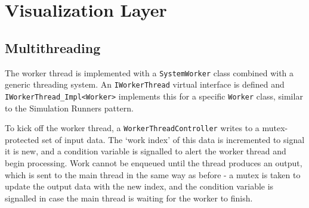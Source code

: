 \section{Visualization Layer}\label{sec:ImplementationViz}
\subsection{Multithreading}
The worker thread is implemented with a \texttt{SystemWorker} class combined with a generic threading system.
An \texttt{IWorkerThread} virtual interface is defined and \texttt{IWorkerThread_Impl<Worker>} implements this for a specific \texttt{Worker} class, similar to the Simulation Runners pattern.

To kick off the worker thread, a \texttt{WorkerThreadController} writes to a mutex-protected set of input data.
The `work index' of this data is incremented to signal it is new, and a condition variable is signalled to alert the worker thread and begin processing.
Work cannot be enqueued until the thread produces an output, which is sent to the main thread in the same way as before - a mutex is taken to update the output data with the new index, and the condition variable is signalled in case the main thread is waiting for the worker to finish.

